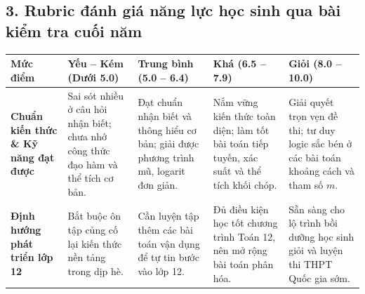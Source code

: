 \documentclass[12pt, a4paper]{article}
\begin{document}
\vspace{5pt}

\subsection*{3. Rubric đánh giá năng lực học sinh qua bài kiểm tra cuối năm}

\begin{center}
\begin{tabularx}{\textwidth}{|p{3cm}|X|X|X|X|}
\hline
\textbf{Mức điểm} & \textbf{Yếu -- Kém (Dưới 5.0)} & \textbf{Trung bình (5.0 -- 6.4)} & \textbf{Khá (6.5 -- 7.9)} & \textbf{Giỏi (8.0 -- 10.0)} \\
\hline
\textbf{Chuẩn kiến thức \& Kỹ năng đạt được} & Sai sót nhiều ở câu hỏi nhận biết; chưa nhớ công thức đạo hàm và thể tích cơ bản. & Đạt chuẩn nhận biết và thông hiểu cơ bản; giải được phương trình mũ, logarit đơn giản. & Nắm vững kiến thức toàn diện; làm tốt bài toán tiếp tuyến, xác suất và thể tích khối chóp. & Giải quyết trọn vẹn đề thi; tư duy logic sắc bén ở các bài toán khoảng cách và tham số $m$. \\
\hline
\textbf{Định hướng phát triển lớp 12} & Bắt buộc ôn tập củng cố lại kiến thức nền tảng trong dịp hè. & Cần luyện tập thêm các bài toán vận dụng để tự tin bước vào lớp 12. & Đủ điều kiện học tốt chương trình Toán 12, nên mở rộng bài toán phân hóa. & Sẵn sàng cho lộ trình bồi dưỡng học sinh giỏi và luyện thi THPT Quốc gia sớm. \\
\hline
\end{tabularx}
\end{center}
\end{document}
